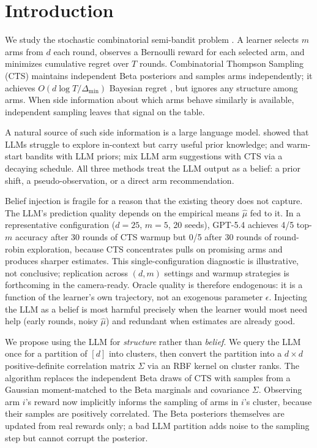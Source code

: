 \documentclass{article}
\theoremstyle{plain}
\theoremstyle{definition}
\theoremstyle{remark}
\newcommand{\gap}{\Delta_{\min}}
\begin{document}
\section{Introduction}\label{sec:intro}

We study the stochastic combinatorial semi-bandit problem \citep{chen2013cucb,kveton2015tight,combes2015combinatorial}.
A learner selects $m$ arms from $d$ each round, observes a Bernoulli reward for each selected arm, and minimizes cumulative regret over $T$ rounds.
Combinatorial Thompson Sampling (CTS) \citep{wang2018cts} maintains independent Beta posteriors and samples arms independently; it achieves $O(d \log T / \gap)$ Bayesian regret \citep{perrault2020statistical}, but ignores any structure among arms.
When side information about which arms behave similarly is available, independent sampling leaves that signal on the table.

A natural source of such side information is a large language model.
\citet{krishnamurthy2024canllms} showed that LLMs struggle to explore in-context but carry useful prior knowledge;
\citet{alamdari2024jumpstarting} and \citet{bayley2025jumpstart} warm-start bandits with LLM priors;
\citet{sun2025tsllm} mix LLM arm suggestions with CTS via a decaying schedule.
All three methods treat the LLM output as a belief: a prior shift, a pseudo-observation, or a direct arm recommendation.

Belief injection is fragile for a reason that the existing theory does not capture.
The LLM's prediction quality depends on the empirical means $\hat\mu$ fed to it.
In a representative configuration ($d{=}25$, $m{=}5$, 20 seeds), GPT-5.4 achieves 4/5 top-$m$ accuracy after 30 rounds of CTS warmup but 0/5 after 30 rounds of round-robin exploration, because CTS concentrates pulls on promising arms and produces sharper estimates.
This single-configuration diagnostic is illustrative, not conclusive; replication across $(d, m)$ settings and warmup strategies is forthcoming in the camera-ready.
Oracle quality is therefore endogenous: it is a function of the learner's own trajectory, not an exogenous parameter $\epsilon$.
Injecting the LLM as a belief is most harmful precisely when the learner would most need help (early rounds, noisy $\hat\mu$) and redundant when estimates are already good.

We propose using the LLM for \emph{structure} rather than \emph{belief}.
We query the LLM once for a partition of $[d]$ into clusters, then convert the partition into a $d \times d$ positive-definite correlation matrix $\Sigma$ via an RBF kernel on cluster ranks.
The algorithm replaces the independent Beta draws of CTS with samples from a Gaussian moment-matched to the Beta marginals and covariance $\Sigma$.
Observing arm $i$'s reward now implicitly informs the sampling of arms in $i$'s cluster, because their samples are positively correlated.
The Beta posteriors themselves are updated from real rewards only; a bad LLM partition adds noise to the sampling step but cannot corrupt the posterior.
\end{document}
